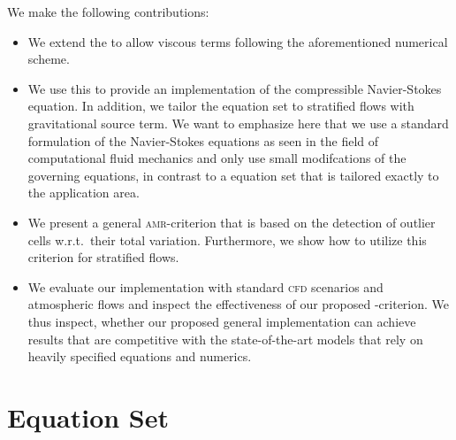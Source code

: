 \documentclass[runningheads]{llncs}
\begin{document}
We make the following contributions:
\begin{itemize}%
\item We extend the \exahypeengine{} to allow viscous terms following the aforementioned numerical scheme.
\item We use this to provide an implementation of the compressible Navier-Stokes equation.
  In addition, we tailor the equation set to stratified flows with gravitational source term.
  We want to emphasize here that we use a standard formulation of the Navier-Stokes equations as seen in the field of computational fluid mechanics and only use small modifcations of the governing equations, in contrast to a equation set that is tailored exactly to the application area.
\item We present a general \textsc{amr}-criterion that is based on the detection of outlier cells w.r.t.\ their total variation.
  Furthermore, we show how to utilize this criterion for stratified flows.
\item We evaluate our implementation with standard \textsc{cfd} scenarios and atmospheric flows and inspect the effectiveness of our proposed \amr{}-criterion.
  We thus inspect, whether our proposed general implementation can achieve results that are competitive with the state-of-the-art models that rely on heavily specified equations and numerics.
\end{itemize}

\section{Equation Set}
\newcommand{\diffCoeff}{\varepsilon}%
\newcommand{\hyperFluxDef}{
  \begin{pmatrix}
    \Qj \\
    \Qv  \otimes \Qj + \bm{I} \pressure  \\
    \Qv \cdot (\bm{I} \QE + \bm{I} \pressure)
  \end{pmatrix}
}%
\newcommand{\viscFluxDef}{
  \begin{pmatrix}
    0\\
     \stressT (\Q, \gradQ)  \\
     \Qv \cdot \stressT (\Q, \gradQ) - \kappa \gradient{T}
   \end{pmatrix}
}%
\end{document}

